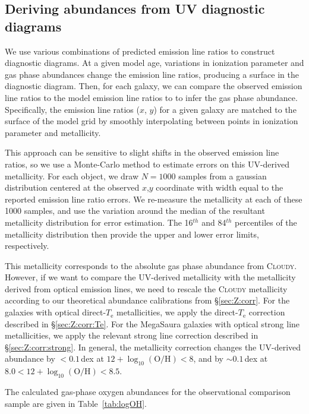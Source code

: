 \documentclass[preprint2]{aastex62}
\newcommand{\Cloudy}{\textsc{Cloudy}\xspace}
\newcommand{\logten}{\ensuremath{\log_{10}}}
\newcommand{\logOH}{\ensuremath{\logten (\mathrm{O}/\mathrm{H})}\xspace}
\newcommand{\mage}{{\sc Meg}a{\sc S}a{\sc ura}\xspace}
\newcommand{\Te}{\ensuremath{T_{\mathrm{e}}}\xspace}
\begin{document}
\subsection{Deriving abundances from UV diagnostic diagrams}\label{sec:Z:UV}
We use various combinations of predicted emission line ratios to construct diagnostic diagrams. At a given model age, variations in ionization parameter and gas phase abundances change the emission line ratios, producing a surface in the diagnostic diagram. Then, for each galaxy, we can compare the observed emission line ratios to the model emission line ratios to to infer the gas phase abundance. Specifically, the emission line ratios ($x$, $y$) for a given galaxy are matched to the surface of the model grid by smoothly interpolating between points in ionization parameter and metallicity.

This approach can be sensitive to slight shifts in the observed emission line ratios, so we use a Monte-Carlo method to estimate errors on this UV-derived metallicity. For each object, we draw $N=1000$ samples from a gaussian distribution centered at the observed $x$,$y$ coordinate  with width equal to the reported emission line ratio errors. We re-measure the metallicity at each of these 1000 samples, and use the variation around the median of the resultant metallicity distribution for error estimation. The 16$^{th}$ and 84$^{th}$ percentiles of the metallicity distribution then provide the upper and lower error limits, respectively.

This metallicity corresponds to the absolute gas phase abundance from \Cloudy. However, if we want to compare the UV-derived metallicity with the metallicity derived from optical emission lines, we need to rescale the \Cloudy metallicity according to our theoretical abundance calibrations from \S\ref{sec:Z:corr}. For the \citet{Berg+2016} galaxies  with optical direct-\Te metallicities, we apply the direct-\Te correction described in \S\ref{sec:Z:corr:Te}. For the \mage galaxies with optical strong line metallicities, we apply the relevant strong line correction described in \S\ref{sec:Z:corr:strong}. In general, the metallicity correction changes the UV-derived abundance by $<0.1$\,dex at $12 + \logOH < 8$, and by ${\sim}0.1$\,dex at $8.0 < 12 + \logOH < 8.5$.

The calculated gas-phase oxygen abundances for the observational comparison sample are given in Table~\ref{tab:logOH}.
\end{document}
